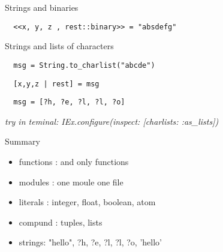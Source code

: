 \begin{frame}[fragile]{Strings and binaries}

\vspace{20pt}  \pause
\begin{verbatim}  
  <<x, y, z , rest::binary>> = "absdefg"
\end{verbatim}  
  
\end{frame}

\begin{frame}[fragile]{Strings and lists of characters}

\vspace{20pt}  \pause  
\begin{verbatim}
  msg = String.to_charlist("abcde")
\end{verbatim}

\vspace{20pt}  \pause
\begin{verbatim}  
  [x,y,z | rest] = msg
\end{verbatim}

\vspace{20pt}  \pause
\begin{verbatim}  
  msg = [?h, ?e, ?l, ?l, ?o]
\end{verbatim}

\vspace{20pt}\pause
 {\em try in teminal:  IEx.configure(inspect: [charlists: :as_lists])}

\end{frame}

\begin{frame}{Summary}

  \pause
  \begin{itemize}
  \item functions : and only functions \pause
  \item modules : one moule one file  \pause
  \item literals : integer, float, boolean, atom \pause
  \item compund :  tuples, lists \pause
  \item strings:  "hello", ?h, ?e, ?l, ?l, ?o, 'hello'
  \end{itemize}

\end{frame}



